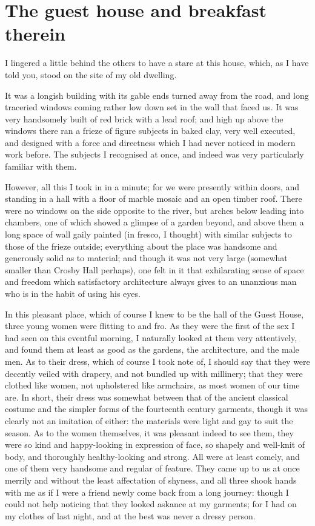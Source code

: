 \chapter{The guest house and breakfast therein}

I lingered a little behind the others to have a stare at this house,
which, as I have told you, stood on the site of my old dwelling.

It was a longish building with its gable ends turned away from the road,
and long traceried windows coming rather low down set in the wall that
faced us. It was very handsomely built of red brick with a lead roof;
and high up above the windows there ran a frieze of figure subjects in
baked clay, very well executed, and designed with a force and directness
which I had never noticed in modern work before. The subjects I
recognised at once, and indeed was very particularly familiar with them.

However, all this I took in in a minute; for we were presently within
doors, and standing in a hall with a floor of marble mosaic and an open
timber roof. There were no windows on the side opposite to the river,
but arches below leading into chambers, one of which showed a glimpse of
a garden beyond, and above them a long space of wall gaily painted (in
fresco, I thought) with similar subjects to those of the frieze outside;
everything about the place was handsome and generously solid as to
material; and though it was not very large (somewhat smaller than Crosby
Hall perhaps), one felt in it that exhilarating sense of space and
freedom which satisfactory architecture always gives to an unanxious man
who is in the habit of using his eyes.

In this pleasant place, which of course I knew to be the hall of the
Guest House, three young women were flitting to and fro. As they were
the first of the sex I had seen on this eventful morning, I naturally
looked at them very attentively, and found them at least as good as the
gardens, the architecture, and the male men. As to their dress, which of
course I took note of, I should say that they were decently veiled with
drapery, and not bundled up with millinery; that they were clothed like
women, not upholstered like armchairs, as most women of our time are. In
short, their dress was somewhat between that of the ancient classical
costume and the simpler forms of the fourteenth century garments, though
it was clearly not an imitation of either: the materials were light and
gay to suit the season. As to the women themselves, it was pleasant
indeed to see them, they were so kind and happy-looking in expression of
face, so shapely and well-knit of body, and thoroughly healthy-looking
and strong. All were at least comely, and one of them very handsome and
regular of feature. They came up to us at once merrily and without the
least affectation of shyness, and all three shook hands with me as if I
were a friend newly come back from a long journey: though I could not
help noticing that they looked askance at my garments; for I had on my
clothes of last night, and at the best was never a dressy person.

